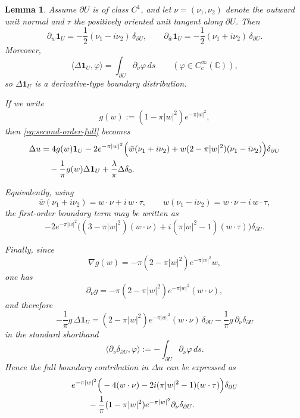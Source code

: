 \documentclass[11pt]{article}
\newtheorem{lemma}[theorem]{Lemma}
\newcommand{\C}{\mathbb C}
\newcommand{\1}{\mathbf 1}
\newcommand{\pw}{\partial_w}
\newcommand{\pwb}{\partial_{\bar w}}
\begin{document}
\begin{lemma}\label{lem:boundary-decomposition}
Assume \(\partial U\) is of class \(C^1\), and let \(\nu=(\nu_1,\nu_2)\) denote the outward
unit normal and \(\tau\) the positively oriented unit tangent along \(\partial U\). Then
\[
\pw \1_U
=
-\frac12(\nu_1-i\nu_2)\,\delta_{\partial U},
\qquad
\pwb \1_U
=
-\frac12(\nu_1+i\nu_2)\,\delta_{\partial U}.
\]
Moreover,
\[
\langle \Delta \1_U,\varphi\rangle
=
\int_{\partial U}\partial_\nu \varphi\,ds
\qquad
(\varphi\in C_c^\infty(\C)),
\]
so \(\Delta \1_U\) is a derivative-type boundary distribution.

If we write
\[
g(w):=(1-\pi|w|^2)e^{-\pi|w|^2},
\]
then \eqref{eq:second-order-full} becomes
\begin{align}
\Delta u
&=
4g(w)\1_U
-2e^{-\pi|w|^2}
\Big(
\bar w(\nu_1+i\nu_2)
+w(2-\pi|w|^2)(\nu_1-i\nu_2)
\Big)\delta_{\partial U} \notag\\
&\quad
-\frac1\pi g(w)\Delta \1_U
+\frac{\lambda}{\pi}\Delta\delta_0. \label{eq:boundary-complex}
\end{align}

Equivalently, using
\[
\bar w(\nu_1+i\nu_2)=w\cdot \nu+i\,w\cdot \tau,
\qquad
w(\nu_1-i\nu_2)=w\cdot \nu-i\,w\cdot \tau,
\]
the first-order boundary term may be written as
\begin{equation}\label{eq:boundary-normal-tangent}
-2e^{-\pi|w|^2}
\Big(
(3-\pi|w|^2)(w\cdot \nu)
+i(\pi|w|^2-1)(w\cdot \tau)
\Big)\delta_{\partial U}.
\end{equation}

Finally, since
\[
\nabla g(w)=-\pi(2-\pi|w|^2)e^{-\pi|w|^2}w,
\]
one has
\[
\partial_\nu g
=
-\pi(2-\pi|w|^2)e^{-\pi|w|^2}(w\cdot \nu),
\]
and therefore
\[
-\frac1\pi g\,\Delta \1_U
=
(2-\pi|w|^2)e^{-\pi|w|^2}(w\cdot \nu)\,\delta_{\partial U}
-\frac1\pi g\,\partial_\nu\delta_{\partial U}
\]
in the standard shorthand
\[
\langle \partial_\nu\delta_{\partial U},\varphi\rangle
:=
-\int_{\partial U}\partial_\nu\varphi\,ds.
\]
Hence the full boundary contribution in \(\Delta u\) can be expressed as
\begin{align}
&e^{-\pi|w|^2}
\Big(
-4(w\cdot \nu)-2i(\pi|w|^2-1)(w\cdot \tau)
\Big)\delta_{\partial U} \notag\\
&\qquad
-\frac1\pi(1-\pi|w|^2)e^{-\pi|w|^2}\partial_\nu\delta_{\partial U}. \label{eq:boundary-final}
\end{align}
\end{lemma}
\end{document}
